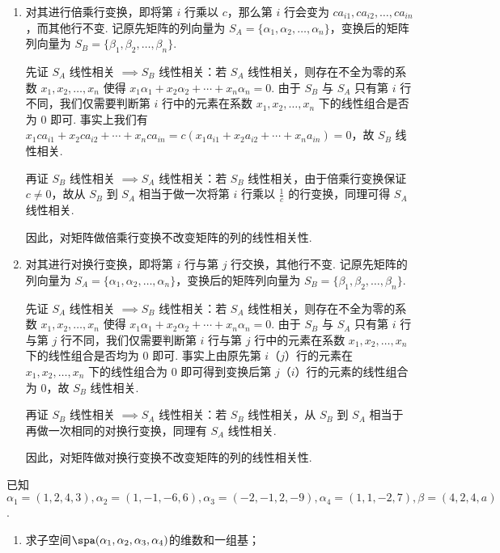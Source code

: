 \begin{exercise}
\begin{exgroup}
\begin{answer}
            \begin{enumerate}
                \item 对其进行倍乘行变换，即将第 $i$ 行乘以 $c$，那么第 $i$ 行会变为 $c a_{i1}, c a_{i2}, \ldots, c a_{in}$，而其他行不变. 记原先矩阵的列向量为 $S_A = \{\alpha_1,\alpha_2,\ldots,\alpha_n\}$，变换后的矩阵列向量为 $S_B = \{\beta_1,\beta_2,\ldots,\beta_n\}$.

                    先证 $S_A$ 线性相关 $\implies S_B$ 线性相关：若 $S_A$ 线性相关，则存在不全为零的系数 $x_1, x_2, \ldots, x_n$ 使得 $x_1 \alpha_1 + x_2 \alpha_2 + \cdots + x_n \alpha_n = 0$. 由于 $S_B$ 与 $S_A$ 只有第 $i$ 行不同，我们仅需要判断第 $i$ 行中的元素在系数 $x_1, x_2, \ldots, x_n$ 下的线性组合是否为 $0$ 即可. 事实上我们有 $x_1 c a_{i1} + x_2 c a_{i2} + \cdots + x_n c a_{in} = c(x_1 a_{i1} + x_2 a_{i2} + \cdots + x_n a_{in}) = 0$，故 $S_B$ 线性相关.

                    再证 $S_B$ 线性相关 $\implies S_A$ 线性相关：若 $S_B$ 线性相关，由于倍乘行变换保证 $c \neq 0$，故从 $S_B$ 到 $S_A$ 相当于做一次将第 $i$ 行乘以 $\frac{1}{c}$ 的行变换，同理可得 $S_A$ 线性相关.

                    因此，对矩阵做倍乘行变换不改变矩阵的列的线性相关性.

                \item 对其进行对换行变换，即将第 $i$ 行与第 $j$ 行交换，其他行不变. 记原先矩阵的列向量为 $S_A = \{\alpha_1,\alpha_2,\ldots,\alpha_n\}$，变换后的矩阵列向量为 $S_B = \{\beta_1,\beta_2,\ldots,\beta_n\}$.

                    先证 $S_A$ 线性相关 $\implies S_B$ 线性相关：若 $S_A$ 线性相关，则存在不全为零的系数 $x_1, x_2, \ldots, x_n$ 使得 $x_1 \alpha_1 + x_2 \alpha_2 + \cdots + x_n \alpha_n = 0$. 由于 $S_B$ 与 $S_A$ 只有第 $i$ 行与第 $j$ 行不同，我们仅需要判断第 $i$ 行与第 $j$ 行中的元素在系数 $x_1, x_2, \ldots, x_n$ 下的线性组合是否均为 $0$ 即可. 事实上由原先第 $i$（$j$）行的元素在 $x_1, x_2, \ldots, x_n$ 下的线性组合为 $0$ 即可得到变换后第 $j$（$i$）行的元素的线性组合为 $0$，故 $S_B$ 线性相关.

                    再证 $S_B$ 线性相关 $\implies S_A$ 线性相关：若 $S_B$ 线性相关，从 $S_B$ 到 $S_A$ 相当于再做一次相同的对换行变换，同理有 $S_A$ 线性相关.

                    因此，对矩阵做对换行变换不改变矩阵的列的线性相关性.
            \end{enumerate}
        \end{answer}

        \item 已知$\alpha_1=(1,2,4,3),\alpha_2=(1,-1,-6,6),\alpha_3=(-2,-1,2,-9),\alpha_4=(1,1,-2,7),\beta=(4,2,4,a)$.
        \begin{enumerate}
            \item 求子空间$\spa(\alpha_1,\alpha_2,\alpha_3,\alpha_4)$的维数和一组基；


\end{enumerate}
\end{exgroup}
\end{exercise}
